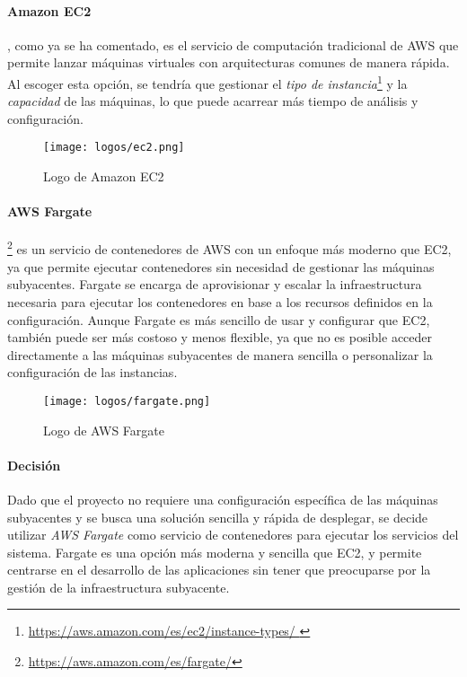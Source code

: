 \paragraph{Amazon EC2}, como ya se ha comentado, es el servicio de computación
tradicional de AWS que permite lanzar máquinas virtuales con arquitecturas
comunes de manera rápida. Al escoger esta opción, se tendría que gestionar el
\textit{tipo de instancia}\footnote{\url{
	https://aws.amazon.com/es/ec2/instance-types/
}} y la \textit{capacidad} de las máquinas, lo que puede acarrear más tiempo de
análisis y configuración.

\begin{figure}[H]
	\centering
	\texttt{[image: logos/ec2.png]}
	\caption{Logo de Amazon EC2~\textregistered}
	\label{fig:ec2}
\end{figure}

\paragraph{AWS Fargate}\footnote{\url{https://aws.amazon.com/es/fargate/}} es un
servicio de contenedores de AWS con un enfoque más moderno que EC2, ya que
permite ejecutar contenedores sin necesidad de gestionar las máquinas
subyacentes. Fargate se encarga de aprovisionar y escalar la infraestructura
necesaria para ejecutar los contenedores en base a los recursos definidos en la
configuración. Aunque Fargate es más sencillo de usar y configurar que EC2,
también puede ser más costoso y menos flexible, ya que no es posible acceder
directamente a las máquinas subyacentes de manera sencilla o personalizar la
configuración de las instancias.

\begin{figure}[H]
	\centering
	\texttt{[image: logos/fargate.png]}
	\caption{Logo de AWS Fargate~\textregistered}
	\label{fig:fargate}
\end{figure}

\paragraph{Decisión}
Dado que el proyecto no requiere una configuración específica de las máquinas
subyacentes y se busca una solución sencilla y rápida de desplegar, se decide
utilizar \textit{AWS Fargate} como servicio de contenedores para ejecutar los
servicios del sistema. Fargate es una opción más moderna y sencilla que EC2, y
permite centrarse en el desarrollo de las aplicaciones sin tener que preocuparse
por la gestión de la infraestructura subyacente.


